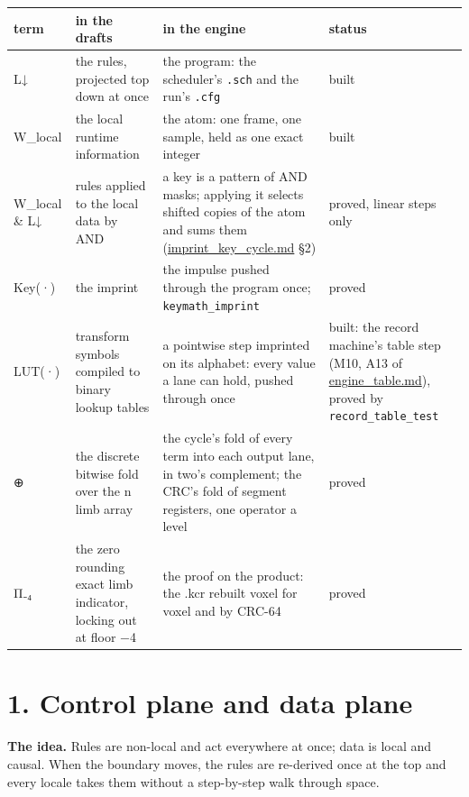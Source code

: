 {\footnotesize
\setlength{\tabcolsep}{6pt}
\begin{longtable}{>{\RaggedRight\arraybackslash}p{}>{\RaggedRight\arraybackslash}p{}>{\RaggedRight\arraybackslash}p{}>{\RaggedRight\arraybackslash}p{}}
\toprule
term & in the drafts & in the engine & status \\
\midrule
\endhead
L↓ & the rules, projected top down at once & the program: the scheduler's \texttt{.\allowbreak{}sch} and the run's \texttt{.\allowbreak{}cfg} & built \\
W\_\allowbreak{}local & the local runtime information & the atom: one frame, one sample, held as one exact integer & built \\
W\_\allowbreak{}local \& L↓ & rules applied to the local data by AND & a key is a pattern of AND masks; applying it selects shifted copies of the atom and sums them (\hyperref[chap:imprint-key-cycle]{imprint\_\allowbreak{}key\_\allowbreak{}cycle.md} §2) & proved, linear steps only \\
Key(·) & the imprint & the impulse pushed through the program once; \texttt{keymath\_\allowbreak{}imprint} & proved \\
LUT(·) & transform symbols compiled to binary lookup tables & a pointwise step imprinted on its alphabet: every value a lane can hold, pushed through once & built: the record machine's table step (M10, A13 of \hyperref[chap:engine-table]{engine\_\allowbreak{}table.md}), proved by \texttt{record\_\allowbreak{}table\_\allowbreak{}test} \\
⊕ & the discrete bitwise fold over the n limb array & the cycle's fold of every term into each output lane, in two's complement; the CRC's fold of segment registers, one operator a level & proved \\
Π₋₄ & the zero rounding exact limb indicator, locking out at floor −4 & the proof on the product: the .kcr rebuilt voxel for voxel and by CRC-64 & proved \\
\bottomrule
\end{longtable}
}

\section{\texorpdfstring{1. Control plane and data plane}{1. Control plane and data plane}}

\textbf{The idea.} Rules are non-local and act everywhere at once; data is local and causal. When the boundary moves, the rules are re-derived once at the top and every locale takes them without a step-by-step walk through space.

